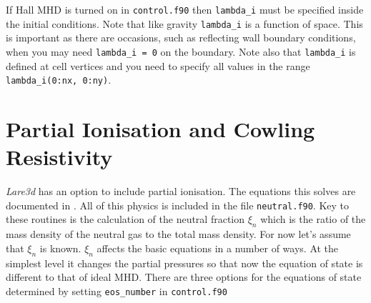 \documentclass[11pt]{article}
\begin{document}
If Hall MHD is turned on in \texttt{control.f90} then {\tt lambda\_i} must be specified inside the initial conditions. Note that like gravity {\tt lambda\_i} is a function of space. This is important as there are occasions, such as reflecting wall boundary conditions, when you may need {\tt lambda\_i = 0} on the boundary. Note also that {\tt lambda\_i} is defined at cell vertices and you need to specify all values in the range {\tt lambda\_i(0:nx, 0:ny)}.

\section{Partial Ionisation and Cowling Resistivity}
{\it Lare3d} has an option to include partial ionisation. The equations this solves are documented in \cite{flux-emergence}. All of this physics is included in the file \texttt{neutral.f90}. Key to these routines is the calculation of the neutral fraction $\xi_n$ which is the ratio of the mass density of the neutral gas to the total mass density. For now let's assume that $\xi_n$ is known. $\xi_n$ affects the basic equations in a number of ways. At the simplest level it changes the partial pressures so that now the equation of state is different to that of ideal MHD. There are three options for the equations of state determined by setting \texttt{eos\_number} in \texttt{control.f90}
\end{document}
